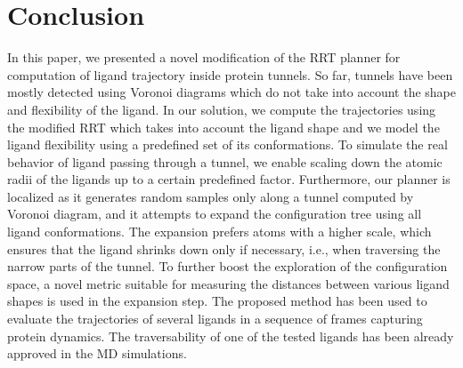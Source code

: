 \documentclass[usletter, 10pt, conference]{ieeeconf} %
\def\dt{d_{tunnel}}
\def\RI{R_{init}}
\def\rv{R_{tunnel}}
\begin{document}



\section{Conclusion}

In this paper, we presented a novel modification of the RRT planner for computation of ligand trajectory inside protein tunnels.
So far, tunnels have been mostly detected using Voronoi diagrams which do not take into account the shape and flexibility of the ligand.
In our solution, we compute the trajectories using the modified RRT which takes into account the ligand shape and we model the ligand flexibility using a predefined set of its conformations.
To simulate the real behavior of ligand passing through a tunnel, we enable scaling down the atomic radii of the ligands up to a certain predefined factor.
Furthermore, our planner is localized as it generates random samples only along a tunnel computed by Voronoi diagram, and it attempts to expand the configuration
tree using all ligand conformations. 
The expansion prefers atoms with a higher scale, which ensures that the ligand shrinks down only if necessary, i.e., when traversing the narrow parts of the tunnel.
To further boost the exploration of the configuration space, a novel metric suitable for measuring the distances between various ligand shapes is used in the expansion step.
The proposed method has been used to evaluate the trajectories of several ligands in a sequence of frames capturing protein dynamics.
The traversability of one of the tested ligands has been already approved in the MD simulations.



\end{document}
